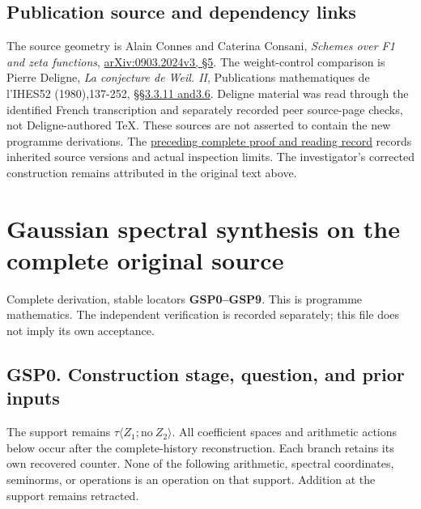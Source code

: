 \section{Publication source and dependency
links}\label{publication-source-and-dependency-links-7}

The source geometry is Alain Connes and Caterina Consani, \emph{Schemes
over F1 and zeta functions},
\href{https://arxiv.org/abs/0903.2024v3}{arXiv:0903.2024v3, §5}. The
weight-control comparison is Pierre Deligne, \emph{La conjecture de
Weil. II}, Publications mathematiques de l'IHES52 (1980),137-252,
\href{https://www.numdam.org/item/PMIHES_1980__52__137_0/}{§§3.3.11
and3.6}. Deligne material was read through the identified French
transcription and separately recorded peer source-page checks, not
Deligne-authored TeX. These sources are not asserted to contain the new
programme derivations. The
\href{https://github.com/KokunoYumeto/zeta-function-research-reader/blob/36a82ecca98addb8a98b48204e349737856c7223/workbenches/splitzero-tandem/continuations/20260924-cohomology-weight-and-character-lifts/BUILD_AND_REVIEW.md}{preceding
complete proof and reading record} records inherited source versions and
actual inspection limits. The investigator's corrected construction
remains attributed in the original text above.

\chapter{Gaussian spectral synthesis on the complete original
source}\label{gaussian-spectral-synthesis-on-the-complete-original-source}

Complete derivation, stable locators \textbf{GSP0--GSP9}. This is
programme mathematics. The independent verification is recorded
separately; this file does not imply its own acceptance.

\section{GSP0. Construction stage, question, and prior
inputs}\label{gsp0.-construction-stage-question-and-prior-inputs}

The support remains \(\tau\langle Z_1;\mathrm{no}\ Z_2\rangle\). All
coefficient spaces and arithmetic actions below occur after the
complete-history reconstruction. Each branch retains its own recovered
counter. None of the following arithmetic, spectral coordinates,
seminorms, or operations is an operation on that support. Addition at
the support remains retracted.

